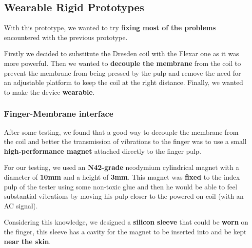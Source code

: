 \subsection{Wearable Rigid Prototypes}
With this prototype, we wanted to try \textbf{fixing most of the problems} encountered with the previous prototype.

Firstly we decided to substitute the Dresden coil with the Flexar one as it was more powerful.
Then we wanted to \textbf{decouple the membrane} from the coil to prevent the membrane from being pressed by the pulp and remove the need for an adjustable platform to keep the coil at the right distance.
Finally, we wanted to make the device \textbf{wearable}.

\subsubsection{Finger-Membrane interface}
After some testing, we found that a good way to decouple the membrane from the coil and better the transmission of vibrations to the finger was to use a small \textbf{high-performance magnet} attached directly to the finger pulp.

For our testing, we used an \textbf{N42-grade} neodymium cylindrical magnet with a diameter of \textbf{10mm} and a height of \textbf{3mm}.
This magnet was \textbf{fixed} to the index pulp of the tester using some non-toxic glue and then he would be able to feel substantial vibrations by moving his pulp closer to the powered-on coil (with an AC signal).

Considering this knowledge, we designed a \textbf{silicon sleeve} that could be \textbf{worn} on the finger, this sleeve has a cavity for the magnet to be inserted into and be kept \textbf{near the skin}.

